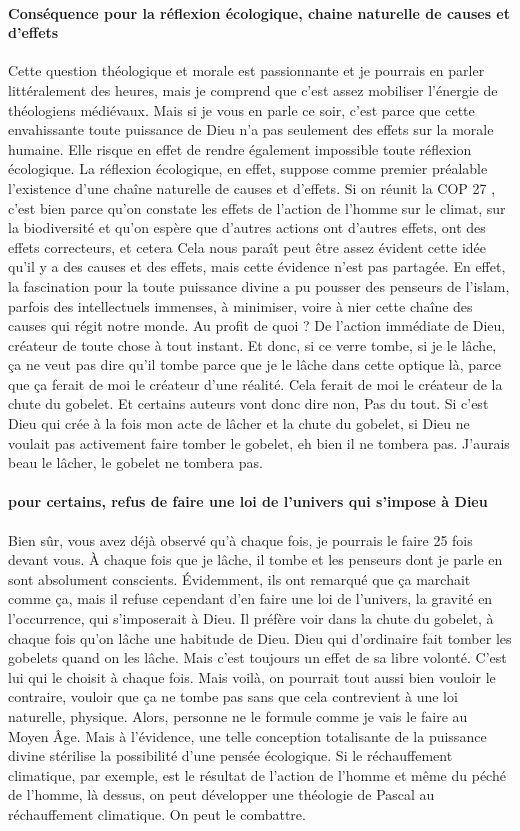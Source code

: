 \paragraph{Conséquence pour la réflexion écologique, chaine naturelle de causes et d'effets}
Cette question théologique et morale est passionnante et je pourrais en parler littéralement des heures, mais je comprend que c'est assez mobiliser l'énergie de théologiens médiévaux. Mais si je vous en parle ce soir, c'est parce que cette envahissante toute puissance de Dieu n'a pas seulement des effets sur la morale humaine. Elle risque en effet de rendre également impossible toute réflexion écologique.
La réflexion écologique, en effet, suppose comme premier préalable l'existence d'une chaîne naturelle de causes et d'effets. Si on réunit la COP 27 , c'est bien parce qu'on constate les effets de l'action de l'homme sur le climat, sur la biodiversité et qu'on espère que d'autres actions ont d'autres effets, ont des effets correcteurs, et cetera Cela nous paraît peut être assez évident cette idée qu'il y a des causes et des effets, mais cette évidence n'est pas partagée.
En effet, la fascination pour la toute puissance divine a pu pousser des penseurs de l'islam, parfois des intellectuels immenses, à minimiser, voire à nier cette chaîne des causes qui régit notre monde. Au profit de quoi ? De l'action immédiate de Dieu, créateur de toute chose à tout instant. Et donc, si ce verre tombe, si je le lâche, ça ne veut pas dire qu'il tombe parce que je le lâche dans cette optique là, parce que ça ferait de moi le créateur d'une réalité.
Cela ferait de moi le créateur de la chute du gobelet. Et certains auteurs vont donc dire non, Pas du tout. Si c'est Dieu qui crée à la fois mon acte de lâcher et la chute du gobelet, si Dieu ne voulait pas activement faire tomber le gobelet, eh bien il ne tombera pas. J'aurais beau le lâcher, le gobelet ne tombera pas.
\paragraph{pour certains, refus de faire une loi de l'univers qui s'impose à Dieu}
Bien sûr, vous avez déjà observé qu'à chaque fois, je pourrais le faire 25 fois devant vous. À chaque fois que je lâche, il tombe et les penseurs dont je parle en sont absolument conscients. Évidemment, ils ont remarqué que ça marchait comme ça, mais il refuse cependant d'en faire une loi de l'univers, la gravité en l'occurrence, qui s'imposerait à Dieu.
Il préfère voir dans la chute du gobelet, à chaque fois qu'on lâche une habitude de Dieu. Dieu qui d'ordinaire fait tomber les gobelets quand on les lâche. Mais c'est toujours un effet de sa libre volonté. C'est lui qui le choisit à chaque fois. Mais voilà, on pourrait tout aussi bien vouloir le contraire, vouloir que ça ne tombe pas sans que cela contrevient à une loi naturelle, physique.
Alors, personne ne le formule comme je vais le faire au Moyen Âge. Mais à l'évidence, une telle conception totalisante de la puissance divine stérilise la possibilité d'une pensée écologique. Si le réchauffement climatique, par exemple, est le résultat de l'action de l'homme et même du péché de l'homme, là dessus, on peut développer une théologie de Pascal au réchauffement climatique. On peut le combattre.
